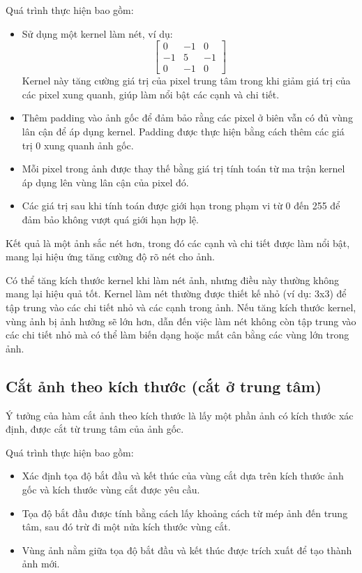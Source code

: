 Quá trình thực hiện bao gồm:
\begin{itemize}
	\item Sử dụng một kernel làm nét, ví dụ:
	      \[
		      \begin{bmatrix}
			      0  & -1 & 0  \\
			      -1 & 5  & -1 \\
			      0  & -1 & 0
		      \end{bmatrix}
	      \]
	      Kernel này tăng cường giá trị của pixel trung tâm trong khi giảm giá trị của các pixel xung quanh, giúp làm nổi bật các cạnh và chi tiết.
	\item Thêm padding vào ảnh gốc để đảm bảo rằng các pixel ở biên vẫn có đủ vùng lân cận để áp dụng kernel. Padding được thực hiện bằng cách thêm các giá trị 0 xung quanh ảnh gốc.

	\item Mỗi pixel trong ảnh được thay thế bằng giá trị tính toán từ ma trận kernel áp dụng lên vùng lân cận của pixel đó.
	\item Các giá trị sau khi tính toán được giới hạn trong phạm vi từ 0 đến 255 để đảm bảo không vượt quá giới hạn hợp lệ.
\end{itemize}

Kết quả là một ảnh sắc nét hơn, trong đó các cạnh và chi tiết được làm nổi bật, mang lại hiệu ứng tăng cường độ rõ nét cho ảnh.

Có thể tăng kích thước kernel khi làm nét ảnh, nhưng điều này thường không mang lại hiệu quả tốt. Kernel làm nét thường được thiết kế nhỏ (ví dụ: 3x3) để tập trung vào các chi tiết nhỏ và các cạnh trong ảnh. Nếu tăng kích thước kernel, vùng ảnh bị ảnh hưởng sẽ lớn hơn, dẫn đến việc làm nét không còn tập trung vào các chi tiết nhỏ mà có thể làm biến dạng hoặc mất cân bằng các vùng lớn trong ảnh.

\subsection{Cắt ảnh theo kích thước (cắt ở trung tâm)}
Ý tưởng của hàm cắt ảnh theo kích thước là lấy một phần ảnh có kích thước xác định, được cắt từ trung tâm của ảnh gốc.

Quá trình thực hiện bao gồm:
\begin{itemize}
	\item Xác định tọa độ bắt đầu và kết thúc của vùng cắt dựa trên kích thước ảnh gốc và kích thước vùng cắt được yêu cầu.
	\item Tọa độ bắt đầu được tính bằng cách lấy khoảng cách từ mép ảnh đến trung tâm, sau đó trừ đi một nửa kích thước vùng cắt.
	\item Vùng ảnh nằm giữa tọa độ bắt đầu và kết thúc được trích xuất để tạo thành ảnh mới.
\end{itemize}

